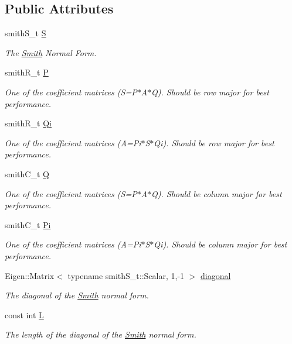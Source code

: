 \subsection*{Public Attributes}
\begin{DoxyCompactItemize}
\item 
smith\+S\+\_\+t \hyperlink{classMackey_1_1Smith_a676606c4002b08a37f0ea11dc3686dbe}{S}
\begin{DoxyCompactList}\small\item\em The \hyperlink{classMackey_1_1Smith}{Smith} Normal Form. \end{DoxyCompactList}\item 
smith\+R\+\_\+t \hyperlink{classMackey_1_1Smith_a5a831316edd85dedc7394b39fda103a2}{P}
\begin{DoxyCompactList}\small\item\em One of the coefficient matrices (S=P$\ast$\+A$\ast$Q). Should be row major for best performance. \end{DoxyCompactList}\item 
smith\+R\+\_\+t \hyperlink{classMackey_1_1Smith_ade9f9fbe25629c7e20bc9cfe69ee91ad}{Qi}
\begin{DoxyCompactList}\small\item\em One of the coefficient matrices (A=Pi$\ast$\+S$\ast$\+Qi). Should be row major for best performance. \end{DoxyCompactList}\item 
smith\+C\+\_\+t \hyperlink{classMackey_1_1Smith_af93f16dfd0ce77406d9696a026092306}{Q}
\begin{DoxyCompactList}\small\item\em One of the coefficient matrices (S=P$\ast$\+A$\ast$Q). Should be column major for best performance. \end{DoxyCompactList}\item 
smith\+C\+\_\+t \hyperlink{classMackey_1_1Smith_a97f16eca1aa9f4f6c36c2680fdcf277e}{Pi}
\begin{DoxyCompactList}\small\item\em One of the coefficient matrices (A=Pi$\ast$\+S$\ast$\+Qi). Should be column major for best performance. \end{DoxyCompactList}\item 
Eigen\+::\+Matrix$<$ typename smith\+S\+\_\+t\+::\+Scalar, 1,-\/1 $>$ \hyperlink{classMackey_1_1Smith_af473e56486c5081b2e1f657bc8df5539}{diagonal}
\begin{DoxyCompactList}\small\item\em The diagonal of the \hyperlink{classMackey_1_1Smith}{Smith} normal form. \end{DoxyCompactList}\item 
const int \hyperlink{classMackey_1_1Smith_a02ea735836a4a70f504e360495b0e1e1}{L}
\begin{DoxyCompactList}\small\item\em The length of the diagonal of the \hyperlink{classMackey_1_1Smith}{Smith} normal form. \end{DoxyCompactList}\end{DoxyCompactItemize}


